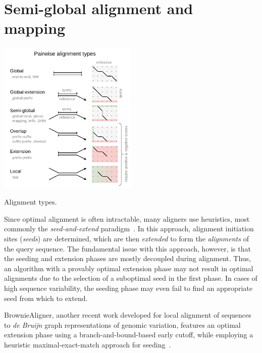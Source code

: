\section{Semi-global alignment and mapping}

\begin{floatingfigure}[l]{0.5\textwidth}
    \includegraphics[width=0.5\textwidth]{alignment-types}
	\caption[Alignment types]{Alignment types.}
    \label{fig:alignment-types}
\end{floatingfigure}

Since optimal alignment is often intractable, many aligners use heuristics, most
commonly the \emph{seed-and-extend}
paradigm~\cite{altschul_basic_1990,langmead_fast_2012,li_fast_2009}. In this
approach, alignment initiation sites (\emph{seeds}) are determined, which are
then \emph{extended} to form the \emph{alignments} of the query sequence. The
fundamental issue with this approach, however, is that the seeding and extension
phases are mostly decoupled during alignment. Thus, an algorithm with a provably
optimal extension phase may not result in optimal alignments due to the
selection of a suboptimal seed in the first phase. In cases of high sequence
variability, the seeding phase may even fail to find an appropriate seed from
which to extend.


BrownieAligner, another recent work developed for local alignment of sequences
to {\itshape de Bruijn} graph representations of genomic variation, features an
optimal extension phase using a branch-and-bound-based early cutoff, while
employing a heuristic maximal-exact-match approach for
seeding~\cite{heydari_browniealigner_2018}.